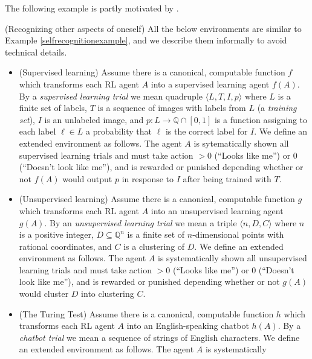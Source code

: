 \documentclass[runningheads]{llncs}
\begin{document}
The following example is partly motivated by \cite{yampolskiy2012ai}.

\begin{example}
\label{otheraspectsexample}
    (Recognizing other aspects of oneself)
    All the below environments are similar to Example \ref{selfrecognitionexample},
    and we describe them informally to avoid technical details.
    \begin{itemize}
        \item
        (Supervised learning)
        Assume there is a canonical, computable function $f$ which transforms
        each RL agent $A$ into a supervised learning agent $f(A)$. By a \emph{supervised
        learning trial} we mean quadruple $\langle L,T,I,p\rangle$ where $L$ is a finite set
        of labels, $T$ is a sequence of images with labels from $L$ (a \emph{training set}),
        $I$ is an unlabeled image, and $p:L\to \mathbb Q\cap [0,1]$ is a function
        assigning to each label $\ell\in L$ a probability that $\ell$ is the correct label
        for $I$. We define an extended environment as follows.
        The agent $A$ is sytematically shown all supervised learning trials and must
        take action $>0$ (``Looks like me'') or $0$ (``Doesn't look like me''), and is
        rewarded or punished depending whether or not $f(A)$ would
        output $p$ in response to $I$ after being trained with $T$.
        \item
        (Unsupervised learning)
        Assume there is a canonical, computable function $g$ which transforms each RL
        agent $A$ into an unsupervised learning agent $g(A)$.
        By an \emph{unsupervised learning trial} we mean a triple
        $\langle n,D,C\rangle$ where $n$ is a positive integer, $D\subseteq \mathbb Q^n$
        is a finite set of $n$-dimensional points with rational coordinates, and $C$
        is a clustering of $D$.
        We define an extended environment as follows. The agent $A$ is systematically
        shown all unsupervised learning trials and must take action $>0$ (``Looks like me'')
        or $0$ (``Doesn't look like me''), and is rewarded or punished depending
        whether or not $g(A)$ would cluster $D$ into clustering $C$.
        \item
        (The Turing Test)
        Assume there is a canonical, computable function $h$ which transforms each RL
        agent $A$ into an English-speaking chatbot $h(A)$.
        By a \emph{chatbot trial} we mean a sequence of strings of English characters.
        We define an extended environment as follows. The agent $A$ is systematically

\end{itemize}
\end{example}
\end{document}
